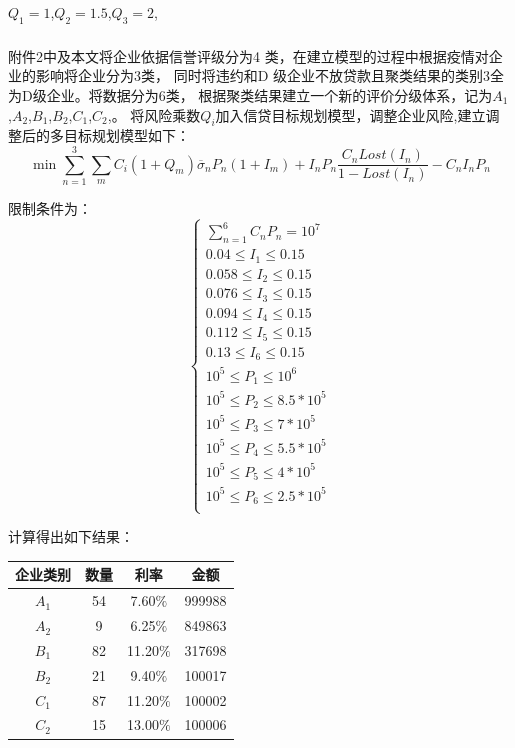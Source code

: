 \documentclass[UTF8]{ctexart}
\begin{document}
		$Q_1=1$,$Q_2=1.5$,$Q_3=2$,
			 
		\subsubsection{}
		附件2中及本文将企业依据信誉评级分为4 类，在建立模型的过程中根据疫情对企业的影响将企业分为3类，
		同时将违约和D 级企业不放贷款且聚类结果的类别3全为D级企业。将数据分为6类，
		根据聚类结果建立一个新的评价分级体系，记为$A_1$,$A_2$,$B_1$,$B_2$,$C_1$,$C_2$,。
		将风险乘数$Q_i$加入信贷目标规划模型，调整企业风险,建立调整后的多目标规划模型如下：
		\begin{equation}
			\min \sum_{n = 1}^{3}\sum_{m}C_i(1+Q_m)\overline{\sigma }_n P_n (1+I_m)+I_n P_n \frac{C_n Lost(I_n)}{1-Lost(I_n)}-C_n I_n P_n   
		\end{equation}
		
		限制条件为：
		\[\left\{\begin{array}{lllll}
			\sum_{n = 1}^{6}C_n  P_n = 10^7 \\
			0.04 \le I_1 \le 0.15\\
			0.058 \le I_2 \le 0.15\\
			0.076 \le I_3 \le 0.15\\
			0.094 \le I_4 \le 0.15\\
			0.112 \le I_5 \le 0.15\\
			0.13 \le I_6 \le 0.15\\
			10^5 \le P_1 \le 10^6\\
			10^5 \le P_2 \le 8.5*10^5\\
			10^5 \le P_3 \le 7*10^5\\
			10^5 \le P_4 \le 5.5*10^5\\
			10^5 \le P_5 \le 4*10^5\\
			10^5 \le P_6 \le 2.5*10^5\\
		
			\end{array}\right. \]
		
		计算得出如下结果：
		
		\begin{center}
			\centering
			\begin{tabular}{||c c c c ||}
				
				\hline
				企业类别 & 数量 & 利率 & 金额        \\ [0.5ex]
				\hline
				$A_1$   & 54     & 7.60$\%$ & 999988  \\
				\hline
				$A_2$   & 9     & 6.25$\%$ & 849863  \\
				\hline
				$B_1$   & 82     & 11.20$\%$ & 317698  \\
				\hline
				$B_2$   & 21     & 9.40$\%$ & 100017  \\
				\hline
				$C_1$   & 87     & 11.20$\%$ & 100002  \\
				\hline
				$C_2$   & 15     & 13.00$\%$ & 100006  \\
				\hline
			\end{tabular}
		\end{center}
		
\end{document}
